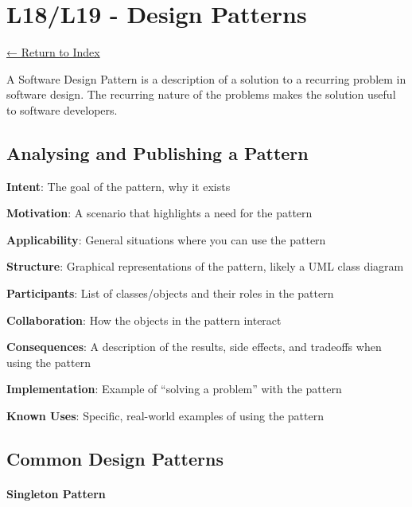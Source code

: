 \documentclass[]{article}
\let\oldparagraph\paragraph
\renewcommand{\paragraph}[1]{\oldparagraph{#1}\mbox{}}
\begin{document}
\hypertarget{l18l19---design-patterns}{%
\section{L18/L19 - Design Patterns}\label{l18l19---design-patterns}}

\protect\hyperlink{table-of-contents}{← Return to Index}

A Software Design Pattern is a description of a solution to a recurring
problem in software design. The recurring nature of the problems makes
the solution useful to software developers.

\hypertarget{analysing-and-publishing-a-pattern}{%
\subsection{Analysing and Publishing a
Pattern}\label{analysing-and-publishing-a-pattern}}

\textbf{Intent}: The goal of the pattern, why it exists

\textbf{Motivation}: A scenario that highlights a need for the pattern

\textbf{Applicability}: General situations where you can use the pattern

\textbf{Structure}: Graphical representations of the pattern, likely a
UML class diagram

\textbf{Participants}: List of classes/objects and their roles in the
pattern

\textbf{Collaboration}: How the objects in the pattern interact

\textbf{Consequences}: A description of the results, side effects, and
tradeoffs when using the pattern

\textbf{Implementation}: Example of ``solving a problem'' with the
pattern

\textbf{Known Uses}: Specific, real-world examples of using the pattern

\hypertarget{common-design-patterns}{%
\subsection{Common Design Patterns}\label{common-design-patterns}}

\hypertarget{singleton-pattern}{%
\paragraph{Singleton Pattern}\label{singleton-pattern}}
\end{document}
